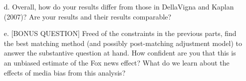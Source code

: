 \documentclass{article}
\begin{document}
\begin{itemize}
\item[d.] Overall, how do your results differ from those in DellaVigna and
  Kaplan (2007)? Are your results and their results comparable?  


\item[e.] [BONUS QUESTION] Freed of the constraints in the previous
parts, find the best matching method (and possibly post-matching
  adjustment model) to answer the substantive question at hand. How
  confident are you that this is an unbiased estimate of the Fox news
  effect?  What do we learn about the effects of media bias from this analysis?    











\end{itemize}
\end{document}
